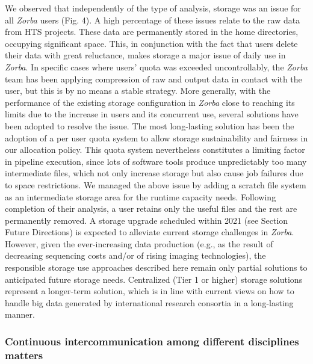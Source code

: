    We observed that independently of the type of analysis, storage was an issue for all \textit{Zorba} users (Fig. 4). 
   A high percentage of these issues relate to the raw data from HTS projects. These data are permanently stored in the home directories, occupying significant space. 
   This, in conjunction with the fact that users delete their data with great reluctance, makes storage a major issue of daily use in \textit{Zorba}. 
   In specific cases where users' quota was exceeded uncontrollably, the \textit{Zorba} team has been applying compression of raw and output data in contact with the user, but this is by no means a stable strategy. 
   More generally, with the performance of the existing storage configuration in \textit{Zorba} close to reaching its limits due to the increase in users and its concurrent use, several solutions have been adopted to resolve the issue. 
   The most long-lasting solution has been the adoption of a per user quota system to allow storage sustainability and fairness in our allocation policy. 
   This quota system nevertheless constitutes a limiting factor in pipeline execution, since lots of software tools produce unpredictably too many intermediate files, which not only increase storage but also cause job failures due to space restrictions. 
   We managed the above issue by adding a scratch file system as an intermediate storage area for the runtime capacity needs. 
   Following completion of their analysis, a user retains only the useful files and the rest are permanently removed. 
   A storage upgrade scheduled within 2021 (see Section Future Directions) is expected to alleviate current storage challenges in \textit{Zorba}. 
   However, given the ever-increasing data production (e.g., as the result of decreasing sequencing costs and/or of rising imaging technologies), the responsible storage use approaches described here remain only partial solutions to anticipated future storage needs. 
   Centralized (Tier 1 or higher) storage solutions represent a longer-term solution, which is in line with current views on how to handle big data generated by international research consortia in a long-lasting manner.



   \subsubsection*{Continuous intercommunication among different disciplines matters}

